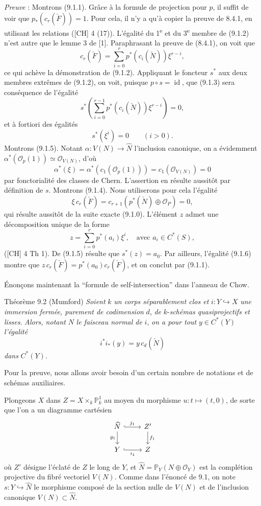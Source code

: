 \emph{Preuve} : Montrons (9.1.1). Grâce à la formule de projection pour $p$, il suffit de voir que $p_*(c_r(\check F))=1$. Pour cela, il n'y a qu'à copier la preuve de 8.4.1, en utilisant les relations ([CH] 4 (17)). L'égalité du 1\textsuperscript{e} et du 3\textsuperscript{e} membre de (9.1.2) n'est autre que le lemme 3 de [1]. Paraphrasant la preuve de (8.4.1), on voit que
\[
c_r(\check F)=\sum_{i=0}^r p^*(c_i(\check N))\xi^{r-i},
\tag*{(9.1.2) bis}
\]
ce qui achève la démonstration de (9.1.2). Appliquant le foncteur $s^*$ aux deux membres extrêmes de (9.1.2), on voit, puisque $p\circ s=\operatorname{id}$, que (9.1.3) sera conséquence de l'égalité
\[
s^*\left(\sum_{i=0}^{r-1}p^*(c_i(\check N))\xi^{r-i}\right)=0,
\]
et à fortiori des égalités
\[
s^*(\xi^i)=0\qquad(i>0).
\tag{9.1.5}
\]
Montrons (9.1.5). Notant $\alpha:V(N)\to\widehat N$ l'inclusion canonique, on a évidemment $\alpha^*(\mathcal{O}_p(1))\simeq\mathcal{O}_{V(N)}$, d'où
\[
\alpha^*(\xi)=\alpha^*(c_1(\mathcal{O}_p(1)))=c_1(\mathcal{O}_{V(N)})=0
\]
par fonctorialité des classes de Chern. L'assertion en résulte aussitôt par définition de $s$. Montrons (9.1.4). Nous utiliserons pour cela l'égalité
\[
\xi\,c_r(\check F)=c_{r+1}(p^*(\check N)\oplus\mathcal{O}_P)=0,
\tag{9.1.6}
\]
qui résulte aussitôt de la suite exacte (9.1.0). L'élément $z$ admet une décomposition unique de la forme
\[
z=\sum_{i=0}^r p^*(a_i)\xi^i,\quad\text{avec }a_i\in C^*(S),
\]
([CH] 4 Th 1). De (9.1.5) résulte que $s^*(z)=a_0$. Par ailleurs, l'égalité (9.1.6) montre que $z\,c_r(\check F)=p^*(a_0)c_r(\check F)$, et on conclut par (9.1.1).

Énonçons maintenant la ``formule de self-intersection'' dans l'anneau de Chow.

\begin{statement}{Théorème 9.2 (Mumford)}
\emph{Soient} $k$ \emph{un corps séparablement clos et} $i:Y\hookrightarrow X$ \emph{une immersion fermée, purement de codimension} $d$, \emph{de} $k$-\emph{schémas quasiprojectifs et lisses}. \emph{Alors, notant} $N$ \emph{le faisceau normal de} $i$, \emph{on a pour tout} $y\in C^*(Y)$ \emph{l'égalité}
\[
i^*i_*(y)=y\,c_d(\check N)
\]
\emph{dans} $C^*(Y)$.
\end{statement}

Pour la preuve, nous allons avoir besoin d'un certain nombre de notations et de schémas auxiliaires.

Plongeons $X$ dans $Z=X\times_k\mathbb{P}^1_k$ au moyen du morphisme $u:t\mapsto(t,0)$, de sorte que l'on a un diagramme cartésien
\[
\begin{tikzcd}
\widehat N \arrow[r,hook,"j_1"] \arrow[d,"g_1"'] & Z' \arrow[d,"f_1"]\\
Y \arrow[r,hook,"i_1"'] & Z
\end{tikzcd}
\]
où $Z'$ désigne l'éclaté de $Z$ le long de $Y$, et $\widehat N=\mathbb{P}_Y(N\oplus\mathcal{O}_Y)$ est la complétion projective du fibré vectoriel $V(N)$. Comme dans l'énoncé de 9.1, on note $s:Y\hookrightarrow\widehat N$ le morphisme composé de la section nulle de $V(N)$ et de l'inclusion canonique $V(N)\subset\widehat N$.

